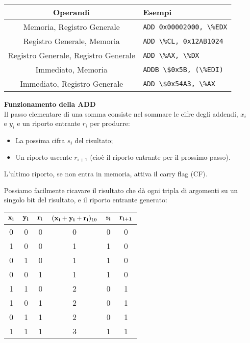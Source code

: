 \documentclass[a4paper,11pt]{article}
\begin{document}
		\begin{table}[h!]
			\center {}
			\begin{tabular} { c | p{5cm} }
				\bfseries Operandi & \bfseries Esempi \\
				\hline
				Memoria, Registro Generale & \lstinline|ADD 0x00002000, \%EDX| \\ 
				Registro Generale, Memoria & \lstinline|ADD \%CL, 0x12AB1024| \\ 
				Registro Generale, Registro Generale & \lstinline|ADD \%AX, \%DX| \\ 
				Immediato, Memoria & \lstinline|ADDB \$0x5B, (\%EDI)| \\ 
				Immediato, Registro Generale & \lstinline|ADD \$0x54A3, \%AX|
			\end{tabular}
		\end{table}

\par\medskip
\noindent
\textbf{\textsf{Funzionamento della ADD}} \\
Il passo elementare di una somma consiste nel sommare le cifre degli addendi, $x_i$ e $y_i$ e un riporto entrante $r_i$ per produrre:
	\begin{itemize}
		\item La possima cifra $s_i$ del risultato;
		\item Un riporto uscente $r_{i+1}$ (cioè il riporto entrante per il prossimo passo).
	\end{itemize}
L'ultimo riporto, se non entra in memoria, attiva il carry flag (CF).

Possiamo facilmente ricavare il risultato che dà ogni tripla di argomenti su un singolo bit del risultato, e il riporto entrante generato:
\begin{table}[h!]
	\center {}
	\begin{tabular} { c | c | c || c || c | c }
		$\bold{x_i}$ & $\bold{y_i}$ & $\bold{r_i}$ & $(\bold{x_i + y_i + r_i})_{10}$ & $\bold{s_i}$ & $\bold{r_{i+1}}$ \\
		\hline 
		0 & 0 & 0 & 0 & 0 & 0 \\
		1 & 0 & 0 & 1 & 1 & 0 \\
		0 & 1 & 0 & 1 & 1 & 0 \\
		0 & 0 & 1 & 1 & 1 & 0 \\
		1 & 1 & 0 & 2 & 0 & 1 \\
		1 & 0 & 1 & 2 & 0 & 1 \\
		0 & 1 & 1 & 2 & 0 & 1 \\
		1 & 1 & 1 & 3 & 1 & 1 \\
	\end{tabular}
\end{table}
\end{document}
